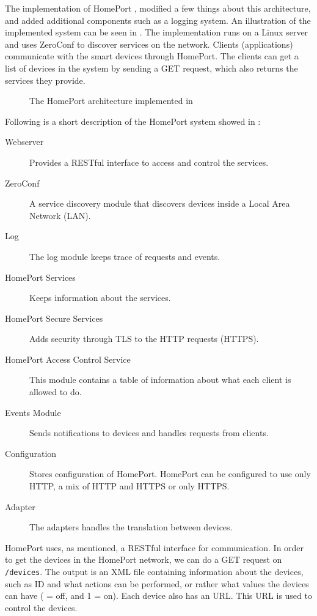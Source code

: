 The implementation of HomePort \cite{HOMEPORT13}, 
modified a few things about this architecture, 
and added additional components such as a logging system. 
An illustration of the implemented system can be seen in .
The implementation runs on a Linux server and uses ZeroConf to discover services on the network. 
Clients (\eg applications) communicate with the smart devices through HomePort. 
The clients can get a list of devices in the system by sending a GET request, 
which also returns the services they provide. 

\begin{figure}[!htb]
    \centering
    
    \caption{The HomePort architecture implemented in \protect\cite{HOMEPORT13}}
    \label{fig:homeport2}
\end{figure}

Following is a short description of the HomePort system showed in :
\begin{description}
    \item[Webserver] Provides a RESTful interface to access and control the services.
    \item[ZeroConf] A service discovery module that discovers devices inside a Local Area Network (LAN).
    \item[Log] The log module keeps trace of requests and events. 
    \item[HomePort Services] Keeps information about the services. 
    \item[HomePort Secure Services] Adds security through TLS to the HTTP requests (HTTPS).
    \item[HomePort Access Control Service] This module contains a table of information about what each client is allowed to do. 
    \item[Events Module] Sends notifications to devices and handles requests from clients.
    \item[Configuration] Stores configuration of HomePort. HomePort can be configured to use only HTTP, a mix of HTTP and HTTPS or only HTTPS.
    \item[Adapter] The adapters handles the translation between devices. 
\end{description}

HomePort uses, as mentioned, a RESTful interface for communication. 
In order to get the devices in the HomePort network, 
we can do a GET request on \texttt{/devices}.
The output is an XML file containing information about the devices,
such as ID and what actions can be performed,
or rather what values the devices can have ( = off, and 1 = on).
Each device also has an URL. 
This URL is used to control the devices. 

